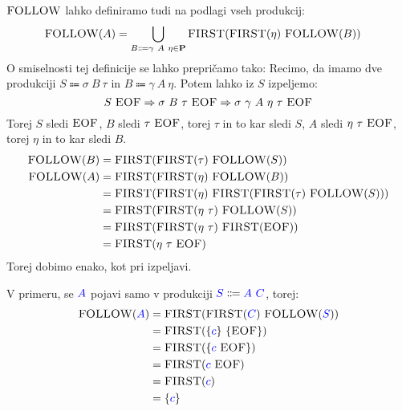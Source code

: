 \documentclass{article}
\newcommand{\FIRST}{\textsc{FIRST}}
\newcommand{\FOLLOW}{\textsc{FOLLOW}}
\newcommand{\EOF}{\textsc{EOF}}
\newcommand{\Set}[1]{\mathbf{#1}}
\newcommand{\Symbol}[1]{\textcolor{blue}{#1}}
\newcommand{\Productions}{\Set{P}}
\newcommand{\Arrow}{\Coloneqq}
\newcommand{\Derive}{\Rightarrow}
\newcommand{\Seq}{\ }
\begin{document}
$\FOLLOW$ lahko definiramo tudi na podlagi vseh produkcij:
\begin{align*}
  \FOLLOW(A) &= \bigcup_{B \Arrow \gamma \Seq A \Seq \eta \in \Productions} \FIRST(\FIRST(\eta) \Seq \FOLLOW(B))
\end{align*}
O smiselnosti tej definicije se lahko prepričamo tako:
Recimo, da imamo dve produkciji $S \Arrow \sigma \Seq B \Seq \tau$ in $B \Arrow \gamma \Seq A \Seq \eta$.
Potem lahko iz $S$ izpeljemo:
\begin{equation*}
  S \Seq \EOF \Derive \sigma \Seq B \Seq \tau \Seq \EOF \Derive \sigma \Seq \gamma \Seq A \Seq \eta \Seq \tau \Seq \EOF
\end{equation*}
Torej $S$ sledi $\EOF$, $B$ sledi $\tau \Seq \EOF$, torej $\tau$ in to kar sledi $S$, $A$ sledi $\eta \Seq \tau \Seq \EOF$, torej $\eta$ in to kar sledi $B$.
\begin{align*}
  \FOLLOW(B) &= \FIRST(\FIRST(\tau) \Seq \FOLLOW(S))\\
  \FOLLOW(A) &= \FIRST(\FIRST(\eta) \Seq \FOLLOW(B))\\
   &= \FIRST(\FIRST(\eta) \Seq \FIRST(\FIRST(\tau) \Seq \FOLLOW(S)))\\
   &= \FIRST(\FIRST(\eta \Seq \tau) \Seq \FOLLOW(S))\\
   &= \FIRST(\FIRST(\eta \Seq \tau) \Seq \FIRST(\EOF))\\
   &= \FIRST(\eta \Seq \tau \Seq \EOF)
\end{align*}
Torej dobimo enako, kot pri izpeljavi.

V primeru, se $\Symbol{A}$ pojavi samo v produkciji $\Symbol{S} \Arrow \Symbol{A} \Seq \Symbol{C}$, torej:
\begin{align*}
  \FOLLOW(\Symbol{A}) &= \FIRST(\FIRST(\Symbol{C}) \Seq \FOLLOW(\Symbol{S})) \\
             &= \FIRST(\{\Symbol{c}\} \Seq \{\EOF\})\\
             &= \FIRST(\{\Symbol{c} \Seq \EOF\})\\
             &= \FIRST(\Symbol{c} \Seq \EOF) \\
             &= \FIRST(\Symbol{c}) \\
             &= \{\Symbol{c}\}
\end{align*}
\end{document}
